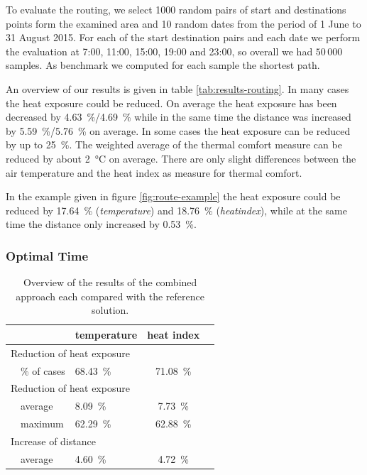To evaluate the routing, we select 1000 random pairs of start and destinations points form the examined  area and 10 random dates from the period of 1 June to 31 August 2015. For each of the start destination pairs and each date we  perform the evaluation at 7:00, 11:00, 15:00, 19:00 and 23:00, so overall we had $50\,000$ samples. As benchmark we computed for each sample the shortest path. 


An overview of our results is given in table \ref{tab:results-routing}. In many cases the heat exposure could be reduced. On average the heat exposure has been decreased by \SI{4.63}{\percent}/\SI{4.69}{\percent} while in the same time the distance was increased by  \SI{5.59}{\percent}/\SI{5.76}{\percent} on average. In some cases the heat exposure can be reduced by up to \SI{25}{\percent}. The weighted average of the thermal comfort measure can be reduced by about \SI{2}{\celsius} on average. There are only slight differences between the air temperature and the heat index as measure for thermal comfort. 

In the example given in figure \ref{fig:route-example} the heat exposure could be reduced by \SI{17.64}{\percent} (\emph{temperature}) and \SI{18.76}{\percent} (\emph{heatindex}), while at the same time the distance only increased by  \SI{0.53}{\percent}.

\subsubsection{Optimal Time}

\begin{table}
	\centering
	\begin{tabular}{lp{9.25cm}lcc}
		\hline
		& & temperature & heat index \\
		\hline
		\multicolumn{4}{l}{Reduction of heat exposure}   \\
		& \% of cases  & \SI{68.43}{\percent} & \SI{71.08}{\percent}  \\
		\multicolumn{4}{l}{Reduction of heat exposure}  \\
		& average  & \SI{8.09}{\percent} & \SI{7.73}{\percent}  \\
		& maximum  & \SI{62.29}{\percent} & \SI{62.88}{\percent}  \\
		\multicolumn{4}{l}{Increase of distance}  \\
		& average  & \SI{4.60}{\percent}  & \SI{4.72}{\percent}  \\
		\hline
	\end{tabular}
	\caption{Overview of the results of the combined approach each compared with the reference solution.  \label{tab:results-optimal-time}}
\end{table}

